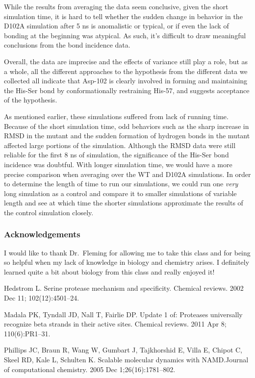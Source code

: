 \documentclass[11pt, twocolumn]{article}
\begin{document}
While the results from averaging the data seem conclusive, given the short
simulation time, it is hard to tell whether the sudden change in behavior
in the D102A simulation after 5 ns is anomalistic or typical, or if even
the lack of bonding at the beginning was atypical. As such, it's difficult
to draw meaningful conclusions from the bond incidence data.

Overall, the data are imprecise and the effects of variance still play a role,
but as a whole, all the different approaches to the hypothesis from the
different data we collected all indicate that Asp-102 is clearly involved in
forming and maintaining the His-Ser bond by conformationally restraining
His-57, and suggests acceptance of the hypothesis.

As mentioned earlier, these simulations suffered from lack of running time.
Because of the short simulation time, odd behaviors such as the sharp increase
in RMSD in the mutant and the sudden formation of hydrogen bonds in the mutant
affected large portions of the simulation. Although the RMSD data were still
reliable for the first 8 ns of simulation, the significance of the His-Ser bond
incidence was doubtful. With longer
simulation time, we would have a more precise comparison when averaging over
the WT and D102A simulations. In order to determine the length of time to run
our simulations, we could run one \textit{very} long simulation as a
control and compare it to smaller simulations of variable length and see
at which time the shorter simulations approximate the results of the control
simulation closely.

\subsubsection*{Acknowledgements}

I would like to thank Dr.\ Fleming for allowing me to take this class
and for being so helpful when my lack of knowledge in biology and chemistry
arises. I definitely learned quite a bit about biology from this class and
really enjoyed it!

\begin{thebibliography}{9}
Hedstrom L. Serine protease mechanism and specificity.
Chemical reviews. 2002 Dec 11; 102(12):4501--24.

Madala PK, Tyndall JD, Nall T, Fairlie DP.\@
Update 1 of: Proteases universally recognize beta strands in their
active sites. Chemical reviews. 2011 Apr 8; 110(6):PR1--31.

Phillips JC, Braun R, Wang W, Gumbart J, Tajkhorshid E, Villa E,
Chipot C, Skeel RD, Kale L, Schulten K. Scalable molecular dynamics
with NAMD.\@ Journal of computational chemistry. 2005 Dec 1;26(16):1781--802.

\end{thebibliography}
\end{document}
